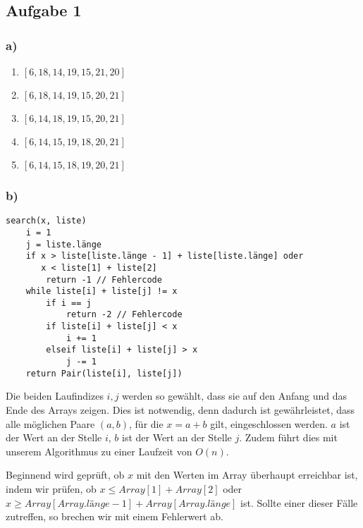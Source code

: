 \documentclass[a4paper,fleqn]{scrartcl}
\begin{document}
\subsection*{Aufgabe 1}
\subsubsection*{a)}
\begin{enumerate}
\item \([6, 18, 14, 19, 15, 21, 20]\)
\item \([6, 18, 14, 19, 15, 20, 21]\)
\item \([6, 14, 18, 19, 15, 20, 21]\)
\item \([6, 14, 15, 19, 18, 20, 21]\)
\item \([6, 14, 15, 18, 19, 20, 21]\)
\end{enumerate}

\subsubsection*{b)}
\begin{verbatim}
search(x, liste)
    i = 1
    j = liste.länge
    if x > liste[liste.länge - 1] + liste[liste.länge] oder
       x < liste[1] + liste[2]
        return -1 // Fehlercode
    while liste[i] + liste[j] != x
        if i == j
            return -2 // Fehlercode
        if liste[i] + liste[j] < x
            i += 1
        elseif liste[i] + liste[j] > x
            j -= 1
    return Pair(liste[i], liste[j])
\end{verbatim}

Die beiden Laufindizes \(i, j\) werden so gewählt, dass sie auf den Anfang und das Ende
des Arrays zeigen. Dies ist notwendig, denn dadurch ist gewährleistet, dass alle
möglichen Paare \((a, b)\), für die \(x = a + b\) gilt, eingeschlossen werden.
\(a\) ist der Wert an der Stelle \(i\), \(b\) ist der Wert an der Stelle \(j\).
Zudem führt dies mit unserem Algorithmus zu einer Laufzeit von \(O(n)\).

Beginnend wird geprüft, ob \(x\) mit den Werten im Array überhaupt erreichbar 
ist, indem wir prüfen, ob \(x \leq Array[1] + Array[2]\) oder \(x \geq Array
[Array.länge - 1] + Array[Array.länge]\) ist. Sollte einer dieser Fälle zutreffen, 
so brechen wir mit einem Fehlerwert ab.
\end{document}
